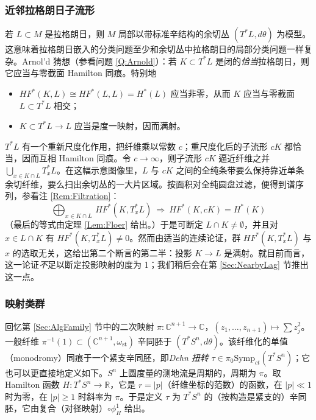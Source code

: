 \documentclass[11pt,a4paper]{article}
\numberwithin{equation}{section}
\newcommand{\bR}{\mathbb{R}}
\newcommand{\bC}{\mathbb{C}}
\newcommand{\Symp}{\mathrm{Symp}}
\newcommand{\st}{\operatorname{st}}
\begin{document}
\subsubsection{近邻拉格朗日子流形} 若 $L\subset M$ 是拉格朗日，则 $M$ 局部以带标准辛结构的余切丛 $(T^*L, d\theta)$ 为模型。这意味着拉格朗日嵌入的分类问题至少和余切丛中拉格朗日的局部分类问题一样复杂。Arnol'd 猜想（参看问题 \ref{Q:Arnold}）：若 $K\subset T^*L$ 是闭的\emph{恰当}拉格朗日，则它应当与零截面 Hamilton 同痕。特别地
\begin{itemize}
\item  $HF^*(K,L) \cong HF^*(L,L) = H^*(L)$ 应当非零，从而 $K$ 应当与零截面 $L\subset T^*L$ 相交；
\item  $K \subset T^*L \rightarrow L$ 应当是度一映射，因而满射。
\end{itemize}

$T^*L$ 有一个重新尺度化作用，把纤维乘以常数 $c$；重尺度化后的子流形 $cK$ 都恰当，因而互相 Hamilton 同痕。令 $c\rightarrow \infty$，则子流形 $cK$ 逼近纤维之并 $\bigcup_{x \in K \cap L} T_x^*L$。在这幅示意图像里，$L$ 与 $cK$ 之间的全纯条带要么保持靠近单条余切纤维，要么扫出余切丛的一大片区域。按面积对全纯圆盘过滤，便得到谱序列，参看注 \ref{Rem:Filtration}：
\begin{equation} \label{Eqn:FibresShouldGenerate}
\bigoplus_{x\in K\cap L} \, HF^*(K, T_x^*L) \ \Longrightarrow \ HF^*(K,cK) = H^*(K)
\end{equation}
（最后的等式由定理 \ref{Lem:Floer} 给出。）于是可断定 $L\cap K \neq \emptyset$，并且对 $x\in L\cap K$ 有 $HF^*(K, T_x^*L) \neq 0$。然而由适当的连续论证，群 $HF^*(K, T_x^*L)$ 与 $x$ 的选取无关，这给出第二个断言的第二半：投影 $K \rightarrow L$ 是满射。就目前而言，这一论证\emph{不}足以断定投影映射的度为 1；我们稍后会在第 \ref{Sec:NearbyLag} 节推出这一点。

\subsubsection{映射类群} 回忆第 \ref{Sec:AlgFamily} 节中的二次映射 $\pi: \bC^{n+1} \rightarrow \bC$，$(z_1,\ldots,z_{n+1}) \mapsto \sum z_j^2$。一般纤维 $\pi^{-1}(1) \subset (\bC^{n+1}, \omega_{\st})$ 辛同胚于 $(T^*S^n, d\theta)$。该纤维化的单值（monodromy）同痕于一个紧支辛同胚，即\emph{Dehn 扭转} $\tau \in \pi_0\Symp_{ct}(T^*S^n)$；它也可以更直接地定义如下。$S^n$ 上圆度量的测地流是周期的，周期为 $\pi$。取 Hamilton 函数 $H:T^*S^n \rightarrow \bR$，它是 $r=|p|$（纤维坐标的范数）的函数，在 $|p| \ll 1$ 时为零，在 $|p| \geq 1$ 时斜率为 $\pi$。于是定义 $\tau$ 为 $T^*S^n$ 的（按构造是紧支的）辛同胚，它由复合（对径映射）$\circ \phi_H^1$ 给出。
\end{document}
